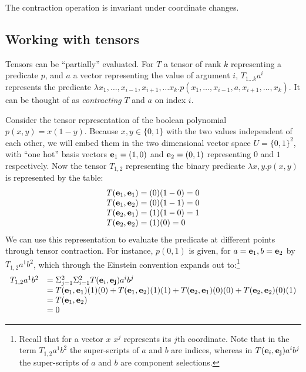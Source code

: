The contraction operation is invariant under coordinate changes.


\subsection{Working with tensors}
  
Tensors can be ``partially'' evaluated. For \(T\) a tensor of rank \(k\) representing a predicate \(p\), and \(a\) a vector representing the value of argument \(i\), \(T_{1\ldots k}a^i\) represents the predicate \(\lambda x_1, \ldots, x_{i-1},x_{i+1},\ldots x_k. p(x_1, \ldots, x_{i-1}, a, x_{i+1}, \ldots, x_k)\). It can be thought of as {\em contracting} \(T\) and \(a\) on index \(i\).
  

\begin{example}\label{ex:tc-1}
  Consider the tensor representation of the boolean polynomial \(p(x,y) = x(1-y)\). Because \(x,y\in \{0,1\}\) with the two values independent of each other, we will embed them in the two dimensional vector space \(U=\{0,1\}^2\), with ``one hot'' basis vectors \({\bf e}_1=(1,0)\) and \({\bf e}_2=(0,1)\) representing \(0\) and \(1\) respectively. Now the tensor \(T_{1,2}\) representing the binary predicate \(\lambda x,y. p(x,y)\) is represented by the table:
  \[
  \begin{array}{l}
    T({\bf e}_1,{\bf e}_1)=(0)(1-0)=0\\
    T({\bf e}_1,{\bf e}_2)=(0)(1-1)=0\\
    T({\bf e}_2,{\bf e}_1)=(1)(1-0)=1\\
    T({\bf e}_2,{\bf e}_2)=(1)(0)=0
  \end{array}
  \]
  We can use this representation to evaluate the predicate at different points through tensor contraction. For instance, \(p(0,1)\) is given, for \(a={\bf e}_1,b={\bf e}_2\) by \(T_{1,2}a^1 b^2\), which through the Einstein convention expands out to:\footnote{Recall that for a vector \(x\) \(x^j\) represents its \(j\)th coordinate. Note that
    in the term \(T_{1,2}a^1b^2\) the super-scripts of \(a\) and \(b\) are indices, whereas in
    \(T({\bf e}_i,{\bf e_j})a^i b^j\) the super-scripts of \(a\) and \(b\) are component selections.}
  \[\begin{array}{ll}
  T_{1,2}a^1 b^2 &= \Sigma_{j=1}^2 \Sigma_{i=1}^2 T({\bf e}_i,{\bf e_j})a^i b^j \\
  &= T({\bf e}_1,{\bf e}_1)(1)(0) + T({\bf e}_1,{\bf e}_2)(1)(1) +
  T({\bf e}_2,{\bf e}_1)(0)(0) + T({\bf e}_2,{\bf e}_2)(0)(1) \\
  & =T({\bf e}_1,{\bf e}_2)\\
  & = 0
  \end{array}
  \]
\end{example}


